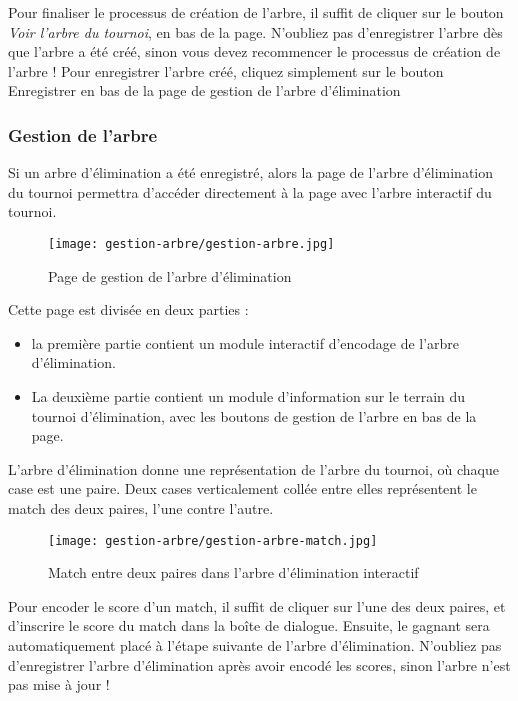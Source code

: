 Pour finaliser le processus de création de l'arbre, il suffit de cliquer sur le bouton \textit{Voir l'arbre du tournoi}, en bas de la page. N'oubliez pas d'enregistrer l'arbre dès que l'arbre a été créé, sinon vous devez recommencer le processus de création de l'arbre ! Pour enregistrer l'arbre créé, cliquez simplement sur le bouton Enregistrer en bas de la page de gestion de l'arbre d'élimination


\subsubsection{Gestion de l'arbre}

Si un arbre d'élimination a été enregistré, alors la page de l'arbre d'élimination du tournoi permettra d'accéder directement à la page avec l'arbre interactif du tournoi.

\begin{figure}[H]
\centering
\texttt{[image: gestion-arbre/gestion-arbre.jpg]}
\caption{Page de gestion de l'arbre d'élimination}
\end{figure}

Cette page est divisée en deux parties :

\begin{itemize}
\item la première partie contient un module interactif d'encodage de l'arbre d'élimination.
\item La deuxième partie contient un module d'information sur le terrain du tournoi d'élimination, avec les boutons de gestion de l'arbre en bas de la page.
\end{itemize}
\bigskip

L'arbre d'élimination donne une représentation de l'arbre du tournoi, où chaque case est une paire. Deux cases verticalement collée entre elles représentent le match des deux paires, l'une contre l'autre.

\begin{figure}[H]
\centering
\texttt{[image: gestion-arbre/gestion-arbre-match.jpg]}
\caption{Match entre deux paires dans l'arbre d'élimination interactif}
\end{figure}

Pour encoder le score d'un match, il suffit de cliquer sur l'une des deux paires, et d'inscrire le score du match dans la boîte de dialogue. Ensuite, le gagnant sera automatiquement placé à l'étape suivante de l'arbre d'élimination. N'oubliez pas d'enregistrer l'arbre d'élimination après avoir encodé les scores, sinon l'arbre n'est pas mise à jour !\newline

